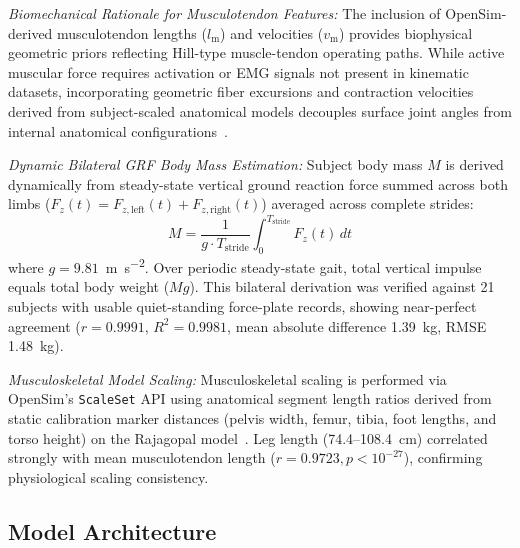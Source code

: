\documentclass[journal]{IEEEtran}
\newcommand{\lm}{l_{\mathrm{m}}}
\newcommand{\vm}{v_{\mathrm{m}}}
\begin{document}
\emph{Biomechanical Rationale for Musculotendon Features:} The inclusion of OpenSim-derived musculotendon lengths ($\lm$) and velocities ($\vm$) provides biophysical geometric priors reflecting Hill-type muscle-tendon operating paths. While active muscular force requires activation or EMG signals not present in kinematic datasets, incorporating geometric fiber excursions and contraction velocities derived from subject-scaled anatomical models decouples surface joint angles from internal anatomical configurations~\cite{delp2007opensim}.

\emph{Dynamic Bilateral GRF Body Mass Estimation:} Subject body mass $M$ is derived dynamically from steady-state vertical ground reaction force summed across both limbs ($F_z(t) = F_{z,\mathrm{left}}(t) + F_{z,\mathrm{right}}(t)$) averaged across complete strides:
\begin{equation}
    M = \frac{1}{g \cdot T_{\mathrm{stride}}} \int_0^{T_{\mathrm{stride}}} F_z(t) \, dt
    \label{eq:mass}
\end{equation}
where $g = 9.81$~\si{\metre\per\second\squared}. Over periodic steady-state gait, total vertical impulse equals total body weight ($M g$). This bilateral derivation was verified against 21 subjects with usable quiet-standing force-plate records, showing near-perfect agreement ($r = 0.9991$, $R^2 = 0.9981$, mean absolute difference 1.39~\si{\kilogram}, RMSE 1.48~\si{\kilogram}).

\emph{Musculoskeletal Model Scaling:} Musculoskeletal scaling is performed via OpenSim's \texttt{ScaleSet} API using anatomical segment length ratios derived from static calibration marker distances (pelvis width, femur, tibia, foot lengths, and torso height) on the Rajagopal model~\cite{rajagopal2016opensim}. Leg length (74.4--108.4~\si{\centi\metre}) correlated strongly with mean musculotendon length ($r = 0.9723, p < 10^{-27}$), confirming physiological scaling consistency.

\subsection{Model Architecture}
\label{sec:model}
\end{document}
